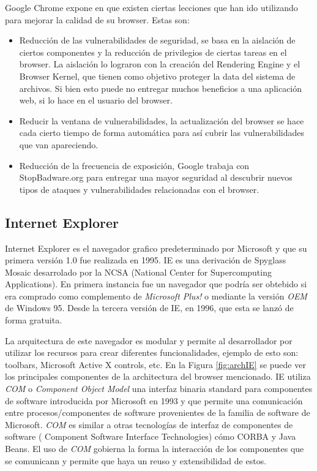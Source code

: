     Google Chrome expone en \cite{reis2009browser} que existen ciertas lecciones que han ido utilizando para mejorar la calidad de su browser. Estas son:

    \begin{itemize}
    	\item Reducción de las vulnerabilidades de seguridad, se basa en la aislación de ciertos componentes y la reducción de privilegios de ciertas tareas en el browser. La aislación lo lograron con la creación del Rendering Engine y el Browser Kernel, que tienen como objetivo proteger la data del sistema de archivos. Si bien esto puede no entregar muchos beneficios a una aplicación web, si lo hace en el usuario del browser.
    	\item Reducir la ventana de vulnerabilidades, la actualización del browser se hace cada cierto tiempo de forma automática para así cubrir las vulnerabilidades que van apareciendo.
    	\item Reducción de la frecuencia de exposición, Google trabaja con StopBadware.org para entregar una mayor seguridad al descubrir nuevos tipos de ataques y vulnerabilidades relacionadas con el browser.
    \end{itemize}



    \subsection{Internet Explorer}
    \label{chap3:IE}
    Internet Explorer es el navegador grafico predeterminado por Microsoft y que su primera versión 1.0 fue realizada en 1995. IE es una derivación de Spyglass Mosaic desarrolado por la NCSA (National Center for Supercomputing Applications). En primera instancia fue un navegador que podría ser obtebido si era comprado como complemento de \textit{Microsoft Plus!} o mediante la versión \textit{OEM} de Windows 95. Desde la tercera versión de IE, en 1996, que esta se lanzó de forma gratuita.
            
    La arquitectura de este navegador es modular y permite al desarrollador por utilizar los recursos para crear diferentes funcionalidades, ejemplo de esto son: toolbars, Microsoft Active X controls, etc. En la Figura \ref{fig:archIE} \cite{IEArch} se puede ver los principales componentes de la architectura del browser mencionado. IE utiliza \textit{COM} o \textit{Component Object Model} una interfaz binaria standard para componentes de software introducida por Microsoft en 1993 y que permite una comunicación entre procesos/componentes de software provenientes de la familia de software de Microsoft. \textit{COM} es similar a otras tecnologías de interfaz de componentes de software ( Component Software Interface Technologies) cómo CORBA y Java Beans. El uso de \textit{COM} gobierna la forma la interacción de los componentes que se comunicann y permite que haya un reuso y extensibilidad de estos.
            
